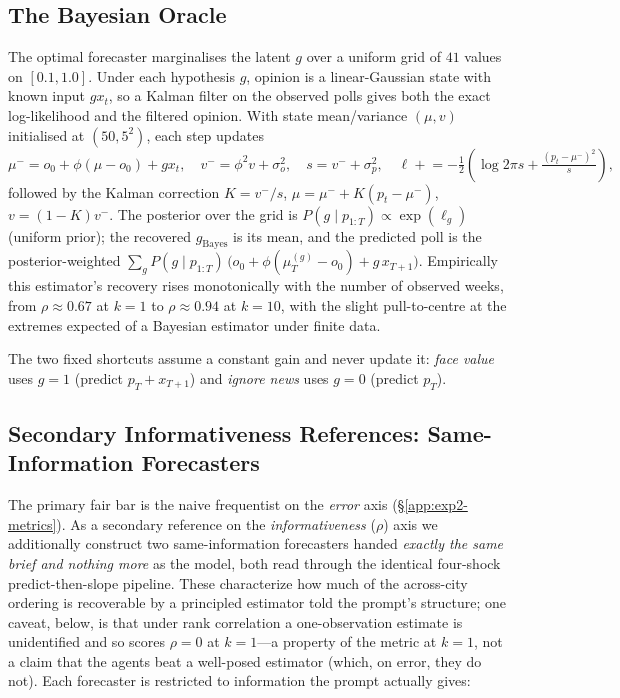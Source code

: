 \documentclass{article} %
\begin{document}
\subsection{The Bayesian Oracle}
\label{app:exp2-oracle}

The optimal forecaster marginalises the latent $g$ over a uniform grid of $41$ values on
$[0.1,1.0]$.  Under each hypothesis $g$, opinion is a linear-Gaussian state with known input
$g x_t$, so a Kalman filter on the observed polls gives both the exact log-likelihood and the
filtered opinion.  With state mean/variance $(\mu,v)$ initialised at $(50, 5^2)$, each step
updates
\begin{equation}
\mu^- = o_0 + \phi(\mu - o_0) + g x_t,\quad v^- = \phi^2 v + \sigma_o^2,\quad
s = v^- + \sigma_p^2,\quad
\ell \mathrel{+}= -\tfrac12\!\left(\log 2\pi s + \tfrac{(p_t-\mu^-)^2}{s}\right),
\end{equation}
followed by the Kalman correction $K=v^-/s$, $\mu=\mu^-+K(p_t-\mu^-)$, $v=(1-K)v^-$.  The
posterior over the grid is $P(g\mid p_{1:T})\propto \exp(\ell_g)$ (uniform prior); the
recovered $\hat g_{\mathrm{Bayes}}$ is its mean, and the predicted poll is the posterior-weighted
$\sum_g P(g\mid p_{1:T})\,\big(o_0+\phi(\mu_T^{(g)}-o_0) + g\,x_{T+1}\big)$.  Empirically this
estimator's recovery rises monotonically with the number of observed weeks, from
$\rho\approx0.67$ at $k=1$ to $\rho\approx0.94$ at $k=10$, with the slight pull-to-centre at the
extremes expected of a Bayesian estimator under finite data.

The two fixed shortcuts assume a constant gain and never update it: \emph{face value} uses
$g{=}1$ (predict $p_T + x_{T+1}$) and \emph{ignore news} uses $g{=}0$ (predict $p_T$).

\subsection{Secondary Informativeness References: Same-Information Forecasters}
\label{app:exp2-parity-refs}

The primary fair bar is the naive frequentist on the \emph{error} axis (\S\ref{app:exp2-metrics}).
As a secondary reference on the \emph{informativeness} ($\rho$) axis we additionally construct two
same-information forecasters handed \emph{exactly the same brief and nothing more} as the model,
both read through the identical four-shock predict-then-slope pipeline.  These characterize how much
of the across-city ordering is recoverable by a principled estimator told the prompt's structure;
one caveat, below, is that under rank correlation a one-observation estimate is unidentified and so
scores $\rho{=}0$ at $k{=}1$---a property of the metric at $k{=}1$, not a claim that the agents beat
a well-posed estimator (which, on error, they do not).  Each forecaster is restricted to information
the prompt actually gives:
\end{document}

